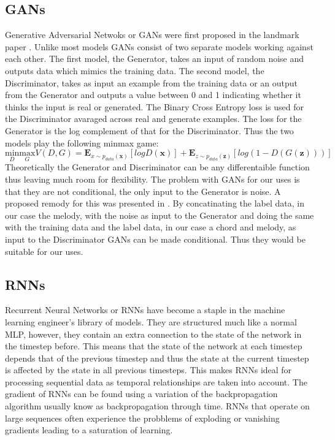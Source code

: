 \subsection{GANs}

Generative Adversarial Netwoks or GANs were first proposed in the landmark paper \cite{GANs}. Unlike most models GANs consist of two separate models working against each other.
The first model, the Generator, takes an input of random noise and outputs data which mimics the training data. 
The second model, the Discriminator, takes as input an example from the training data or an output from the Generator and outputs a value between 0 and 1 indicating whether it thinks the input is real or generated.
The Binary Cross Entropy loss is used for the Discriminator avaraged across real and generate examples. The loss for the Generator is the log complement of that for the Discriminator. Thus the two models play the following minmax game:
\begin{equation}
\underset{D}{\text{min}} \underset{G}{\text{max}} V(D,G) = \mathbf{E}_{x\sim p_{data}(\mathbf{x})}[logD(\mathbf{x})] + \mathbf{E}_{z\sim p_{data}(\mathbf{z})}[log(1-D(G(\mathbf{z})))]
\end{equation} 
Theoretically the Generator and Discriminator can be any differentaible function thus leaving much room for flexibility.
The problem with GANs for our uses is that they are not conditional, the only input to the Generator is noise. A proposed remody for this was presented in \cite{CGANs}.
By concatinating the label data, in our case the melody, with the noise as input to the Generator and doing the same with the training data and the label data, in our case a chord and melody, as input to the Discriminator GANs can be made conditional. 
Thus they would be suitable for our uses. 
\subsection{RNNs}

Recurrent Neural Networks or RNNs have become a staple in the machine learning engineer's library of models. 
They are structured much like a normal MLP, however, they contain an extra connection to the state of the network in the timestep before.
This means that the state of the network at each timestep depends that of the previous timestep and thus the state at the current timestep is affected by the state in all previous timesteps.
This makes RNNs ideal for processing sequential data as temporal relationships are taken into account.
The gradient of RNNs can be found using a variation of the backpropagation algorithm usually know as backpropagation through time.
RNNs that operate on large sequences often experience the probblems of exploding or vanishing gradients leading to a saturation of learning.


